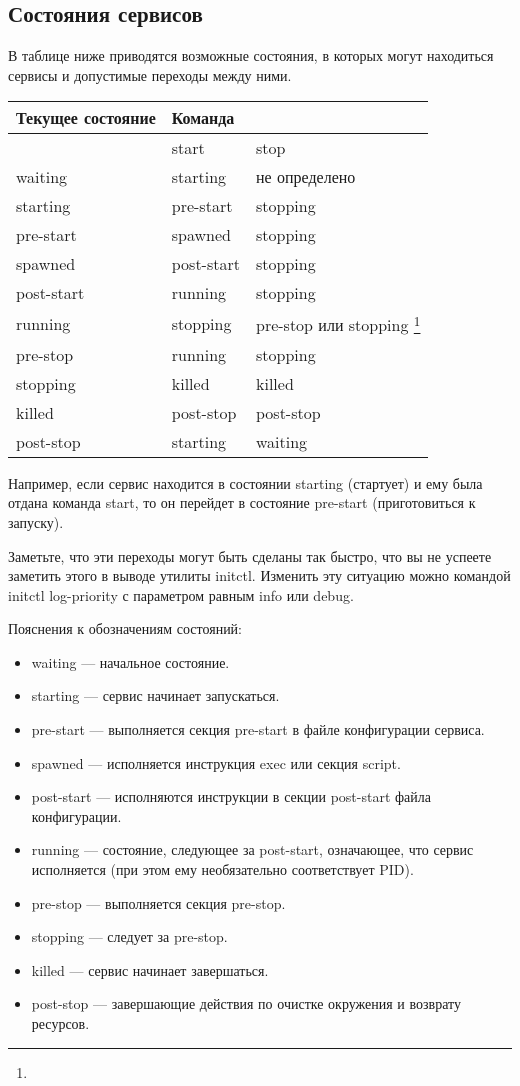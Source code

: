 \subsection{Состояния сервисов}

В таблице ниже приводятся возможные состояния, в которых могут находиться сервисы и допустимые переходы между ними.
\begin{table}[h]
\begin{tabular}{|l|l|l|}
\hline Текущее состояние &  Команда  \\ 
\hline  & start & stop \\ 
\hline waiting & starting & не определено \\ 
\hline starting & pre-start & stopping \\ 
\hline pre-start & spawned & stopping \\ 
\hline spawned & post-start & stopping \\ 
\hline post-start & running & stopping \\
\hline running & stopping & pre-stop или stopping \footnote{} \\
\hline pre-stop & running & stopping \\
\hline stopping & killed & killed \\
\hline killed & post-stop & post-stop \\
\hline post-stop & starting & waiting \\
\hline
\end{tabular} 
\end{table}
Например, если сервис находится в состоянии starting (стартует) и ему была отдана команда start, то он перейдет в состояние pre-start (приготовиться к запуску).

Заметьте, что эти переходы могут быть сделаны так быстро, что вы не успеете заметить этого в выводе утилиты initctl. Изменить эту ситуацию можно командой initctl log-priority с параметром равным info
или debug.

Пояснения к обозначениям состояний: \begin{itemize}
\item waiting --- начальное состояние.
\item starting --- сервис начинает запускаться.
\item pre-start --- выполняется секция pre-start в файле конфигурации сервиса.
\item spawned --- исполняется инструкция exec или секция script.
\item post-start --- исполняются инструкции в секции post-start файла конфигурации.
\item running --- состояние, следующее за post-start, означающее, что сервис исполняется (при этом ему необязательно соответствует PID).
\item pre-stop --- выполняется секция pre-stop.
\item stopping --- следует за pre-stop. 
\item killed --- сервис начинает завершаться.
\item post-stop --- завершающие действия по очистке окружения и возврату ресурсов.
\end{itemize}

